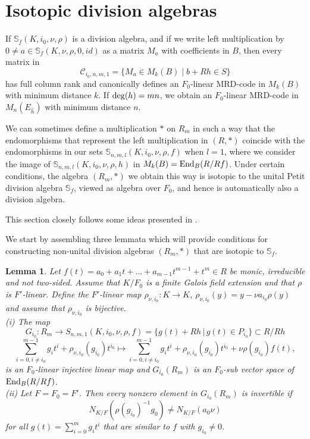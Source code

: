 \documentclass[12pt]{amsart}
\theoremstyle{plain}
\newtheorem{lemma}[theorem]{Lemma}
\theoremstyle{definition}
\numberwithin{equation}{section}
\numberwithin{figure}{section}
\begin{document}
\section{Isotopic division algebras}

If $\mathbb{S}_f(K,i_0,\nu,\rho)$ is a division algebra, and if we write left multiplication by $0\not=a\in \mathbb{S}_f(K,\nu,\rho, 0,id)$  as a matrix $M_a$
with coefficients in $B$, then every matrix in
$$\mathcal{C}_{i_0,n,m,1}=\lbrace M_a\in M_k(B)\mid b+Rh\in S\rbrace$$
 has full column rank and
canonically defines an $F_0$-linear MRD-code  in $M_k(B)$ with minimum distance $k$. If ${\rm deg}(h)=mn$,
 we obtain an $F_0$-linear MRD-code in $M_{n}(E_{\hat{h}})$ with minimum distance $n$.



We can sometimes
define a multiplication $*$ on $R_m$ in such a way  that the endomorphisms that represent the left multiplication in $(R,*)$ coincide with the endomorphisms in our sets $\mathbb{S}_{n,m,l}(K,i_0,\nu,\rho, f)$ when $l=1$, where we consider the image of $\mathbb{S}_{n,m,l}(K,i_0,\nu,\rho,h)$ in $M_{k}(B)={\rm End}_{B}(R/Rf)$. Under certain conditions, the algebra $(R_m,*)$ we obtain this way is isotopic to the unital Petit division algebra $\mathbb{S}_f$, viewed as algebra over $F_0$, and hence is automatically also a division algebra.

This section closely follows some ideas presented in \cite[Section 5]{NewS}.

We start by assembling three lemmata which will provide conditions for constructing non-unital division algebras $(R_m,*)$ that are isotopic to $\mathbb{S}_f$.

\begin{lemma}\label{le:important0}
Let $f(t)=a_0+a_1t+\dots+ a_{m-1} t^{m-1}+t^m \in R$ be monic, irreducible and not two-sided.
Assume that $K/F_0$ is a finite Galois field extension and that $\rho$ is $F'$-linear.
 Define the $F'$-linear map $\rho_{\nu,i_0}: K\to K$, $\rho_{\nu,i_0}(y)=y-\nu a_{i_0}\rho(y)$ and assume that $\rho_{\nu,i_0}$ is bijective.
\\ (i)  The map
$$G_{i_0}:R_m\to S_{n,m,1}(K,i_0,\nu,\rho, f)=\lbrace g(t)+Rh\,|\, g(t)\in P_{i_0}\rbrace\subset R/Rh$$
$$\sum_{i=0,i\not=i_0}^{m-1} g_it^i +\rho_{\nu,i_0}(g_{i_0})t^{i_0}\mapsto
\sum_{i=0,i\not=i_0}^{m-1} g_it^i +\rho_{\nu,i_0}(g_{i_0})t^{i_0}+\nu\rho(g_{i_0})f(t),$$
is an $F_0$-linear injective linear map and $G_{i_0}(R_m)$ is an $F_0$-sub vector space of ${\rm End}_B(R/Rf)$.
 \\ (ii) Let $F=F_0=F'$. Then every nonzero element in $G_{i_0}(R_m)$ is invertible if
 $$N_{K/F}( \rho(g_{i_0})^{-1}  g_0 )\not=N_{K/F}(a_0 \nu)$$
for all $g(t)=\sum_{i=0}^{m}g_it^i$ that are similar to $f$ with $g_{i_0}\not=0$.
\end{lemma}
\end{document}
